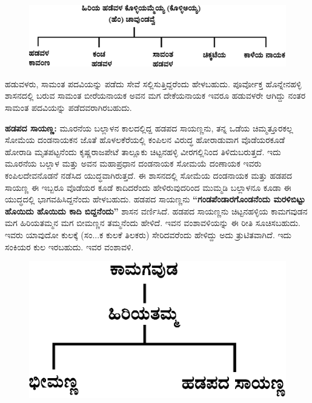 \begin{figure}[H]
\includegraphics[scale=1.25]{images/chap3/chap3fig33.jpeg}
\end{figure}

ಹಡುವಳರು, ಸಾಮಂತ ಪದವಿಯನ್ನು ಪಡೆದು ಸೇವೆ ಸಲ್ಲಿಸುತ್ತಿದ್ದರೆಂದು ಹೇಳಬಹುದು. ಪೂರ್ವೋಕ್ತ ಹೊನ್ನೇನಹಳ್ಳಿ ಶಾಸನದಲ್ಲಿ ಬರುವ ಸಾಮಂತ ಬೀರೆಯನಾಯಕ ಅವನ ಮಗ ದೇಕೆಯನಾಯಕ ಇವರೂ ಹಡುವಳರೇ ಆಗಿದ್ದು ನಂತರ ಸಾಮಂತ ಪದವಿಯನ್ನು ಪಡೆದವರಾಗಿರಬಹುದು.

\textbf{ಹಡಪದ ಸಾಯಣ್ಣ:} ಮೂರನೆಯ ಬಲ್ಲಾಳನ ಕಾಲದಲ್ಲಿದ್ದ ಹಡಪದ ಸಾಯಣ್ಣನು, ತನ್ನ ಒಡೆಯ ಚಿಮ್ಮತ್ತೂರಕಲ್ಲ ಸೋಮೆಯ ದಂಡನಾಯಕನ ಜೊತೆ ಹೊಳಲಕೆರೆಯಲ್ಲಿ ಕಂಪಿಲನ ವಿರುದ್ಧ ಹೋರಾಡುವಾಗ ವೊಡೆಯರಕೂಡೆ ಹೋರಾಡಿ ಮೃತಪಟ್ಟನೆಂದು ಕೃಷ್ಣರಾಜಪೇಟೆ ತಾಲ್ಲೂಕು ಚಿಟ್ಟನಹಳ್ಳಿ ವೀರಗಲ್ಲಿನಿಂದ ತಿಳಿದುಬರುತ್ತದೆ. ಇದು ಮೂರನೆಯ ಬಲ್ಲಾಳ ಮತ್ತು ಅವನ ಮಹಾಪ್ರಧಾನ ದಂಡನಾಯಕ ಸೋಮಯೆ ದಂಣಾಯಕ ಇವರು ಕಂಪಿಲದೇವನೊಡನೆ ನಡೆಸಿದ ಯುದ್ಧವಾಗಿರುತ್ತದೆ. ಈ ಶಾಸನದಲ್ಲಿ ಸೋಮೆಯ ದಂಡನಾಯಕ ಮತ್ತು ಹಡಪದ ಸಾಯಣ್ಣ ಈ ಇಬ್ಬರೂ ವೊಡೆಯರ ಕೂಡೆ ಕಾದಿದರೆಂದು ಹೇಳಿರುವುದರಿಂದ ಮುಮ್ಮಡಿ ಬಲ್ಲಾಳನೂ ಕೂಡಾ ಈ ಯುದ್ಧದಲ್ಲಿ ಭಾಗವಹಿಸಿದ್ದನೆಂದು ಹೇಳಬಹುದು. ಹಡಪದ ಸಾಯಣ್ಣನು \textbf{“ಗಂಡಪೆಂಡಾರಗೊಂಡನೆಂದು ಮರಳಿಬಿಟ್ಟು ಹೊಯಿದು ಹೊಯಿದು ಕಾದಿ ಬಿದ್ದನೆಂದು”} ಶಾಸನ ವರ್ಣಿಸಿದೆ. ಹಡಪದ ಸಾಯಣ್ಣನು ಚಿಟ್ಟನಹಳ್ಳಿಯ ಕಾಮಗವುಡನ ಮಗ ಹಿರಿಯತಮ್ಮನ ಮಗ ಬೀಮಣ್ಣನ ತಮ್ಮನೆಂದು ಹೇಳಿದೆ. ಇವನ ವಂಶಾವಳಿಯನ್ನು ಈ ರೀತಿ ಸೂಚಿಸಬಹುದು. ಇವರು ಯಾವುದೋ ಕುಲಕ್ಕೆ (ಸಂ...ಕ ಕುಲಕೆ ತಿಲಕರು) ಸೇರಿದವರೆಂದು ಹೇಳಿದ್ದು ಅದು ತ್ರುಟಿತವಾಗಿದೆ. ಇದು ಸಂಕಿಯರ ಕುಲ ಇರಬಹುದು. ಇವರ ವಂಶಾವಳಿ.

\begin{figure}[H]
\includegraphics[scale=1.2]{images/chap3/chap3fig34.jpeg}
\end{figure}


